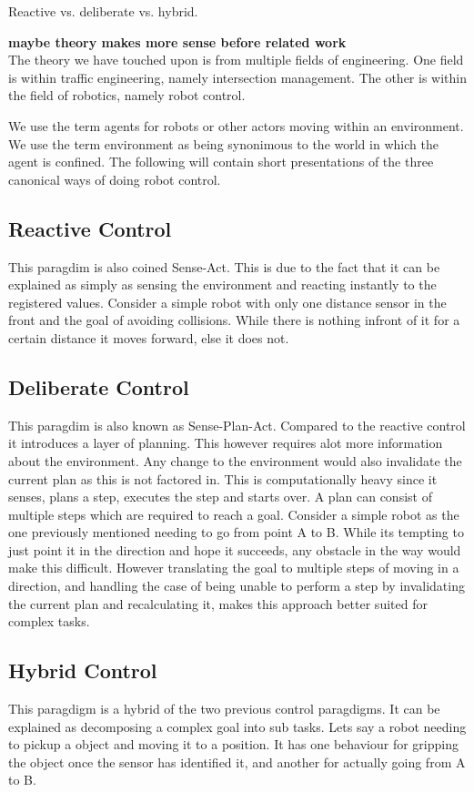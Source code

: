 Reactive vs. deliberate vs. hybrid.

\textbf{maybe theory makes more sense before related work}\\

The theory we have touched upon is from multiple fields of engineering. One field is within traffic engineering, namely intersection management. The other is within the field of robotics, namely robot control.

We use the term agents for robots or other actors moving within an environment.\\
We use the term environment as being synonimous to the world in which the agent is confined.
The following will contain short presentations of the three canonical ways of doing robot control.

\subsection{Reactive Control}
This paragdim is also coined Sense-Act. This is due to the fact that it can be explained as simply as sensing the environment and reacting instantly to the registered values.
Consider a simple robot with only one distance sensor in the front and the goal of avoiding collisions. While there is nothing infront of it for a certain distance it moves forward, else it does not.

\subsection{Deliberate Control}
This paragdim is also known as Sense-Plan-Act.
Compared to the reactive control it introduces a layer of planning.
This however requires alot more information about the environment.
Any change to the environment would also invalidate the current plan as this is not factored in.
This is computationally heavy since it senses, plans a step, executes the step and starts over.
A plan can consist of multiple steps which are required to reach a goal.
Consider a simple robot as the one previously mentioned needing to go from point A to B.
While its tempting to just point it in the direction and hope it succeeds, any obstacle in the way would make this difficult.
However translating the goal to multiple steps of moving in a direction, and handling the case of being unable to perform a step by invalidating the current plan and recalculating it, makes this approach better suited for complex tasks.

\subsection{Hybrid Control}
This paragdigm is a hybrid of the two previous control paragdigms. 
It can be explained as decomposing a complex goal into sub tasks. Lets say a robot needing to pickup a object and moving it to a position.
It has one behaviour for gripping the object once the sensor has identified it, and another for actually going from A to B.
